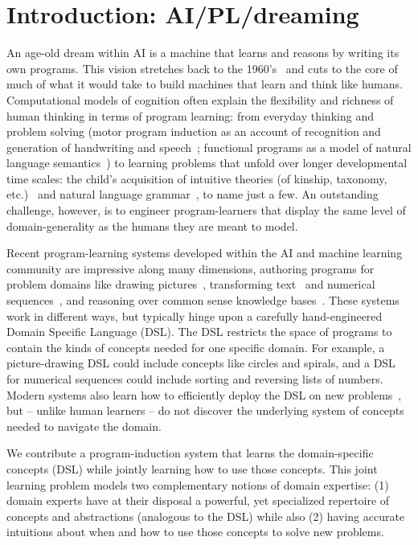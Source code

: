 \documentclass{article}
\begin{document}
\section{Introduction: AI/PL/dreaming}


An age-old dream within AI is a machine that learns and reasons by
writing its own programs.  This vision stretches back to the
1960's~\cite{solomonoff1964formal} and cuts to the core of much of
what it would take to build machines that learn and think like humans.
Computational models of cognition often explain the flexibility and
richness of human thinking in terms of program learning: from everyday
thinking and problem solving (motor program induction as an account of
recognition and generation of handwriting and
speech~\cite{lake2015human}; functional programs as a model of natural
language semantics~\cite{SOMETHING}) to learning problems that unfold
over longer developmental time scales: the child's acquisition of
intuitive theories (of kinship, taxonomy, etc.)~\cite{Ullman2012} and
natural language grammar~\cite{DBLP:journals/cogsr/SchmidK11}, to name
just a few.  An outstanding challenge, however, is to engineer
program-learners that display the same level of domain-generality as
the humans they are meant to model.

Recent program-learning systems developed within the AI and machine
learning community are impressive along many dimensions, authoring
programs for problem domains like drawing
pictures~\cite{spiral,ellis2017learning}, transforming
text~\cite{gulwani2011automating} and numerical
sequences~\cite{balog2016deepcoder}, and reasoning over common sense
knowledge bases~\cite{muggleton2015meta}.  These systems work in
different ways, but typically hinge upon a carefully hand-engineered
Domain Specific Language (DSL).  The DSL restricts the space of
programs to contain the kinds of concepts needed for one specific
domain.  For example, a picture-drawing DSL could include concepts
like circles and spirals, and a DSL for numerical sequences could
include sorting and reversing lists of numbers.  Modern systems also
learn how to efficiently deploy the DSL on new
problems~\cite{devlin2017robustfill,balog2016deepcoder,NGDS}, but --
unlike human learners -- do not discover the underlying system of
concepts needed to navigate the domain.

We contribute a program-induction system that learns the
domain-specific concepts (DSL) while jointly learning how to use those
concepts.  This joint learning problem models two complementary
notions of domain expertise: (1) domain experts have at their disposal
a powerful, yet specialized repertoire of concepts and abstractions
(analogous to the DSL) while also (2) having accurate intuitions about
when and how to use those concepts to solve new problems.
\end{document}
